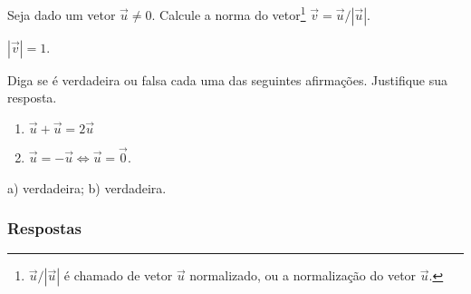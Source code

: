 \begin{exer}
  Seja dado um vetor $\vec{u}\neq 0$. Calcule a norma do vetor\footnote{$\vec{u}/|\vec{u}|$ é chamado de vetor $\vec{u}$ normalizado, ou a normalização do vetor $\vec{u}$.} $\vec{v}=\vec{u}/|\vec{u}|$.
\end{exer}
\begin{resp}
  $|\vec{v}|=1$.
\end{resp}

\begin{exer}
  Diga se é verdadeira ou falsa cada uma das seguintes afirmações. Justifique sua resposta.
  \begin{enumerate}
  \item $\vec{u}+\vec{u} = 2\vec{u}$
  \item $\vec{u}=-\vec{u} \Leftrightarrow \vec{u} = \vec{0}$.
  \end{enumerate}
\end{exer}
\begin{resp}
  a) verdadeira; b) verdadeira.
\end{resp}

\ifisbook
\subsubsection{Respostas}
\shipoutAnswer
\fi
